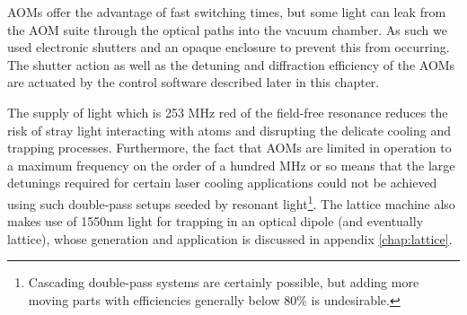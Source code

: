 	AOMs offer the advantage of fast switching times, but some light can leak from the AOM suite through the optical paths into the vacuum chamber.
	As such we used electronic shutters and an opaque enclosure to prevent this from occurring.
	The shutter action as well as the detuning and diffraction efficiency of the AOMs are actuated by the control software described later in this chapter.
	
	The supply of light which is 253 MHz red of the field-free resonance reduces the risk of stray light interacting with atoms and disrupting the delicate cooling and trapping processes.
	Furthermore, the fact that AOMs are limited in operation to a maximum frequency on the order of a hundred MHz or so means that the large detunings required for certain laser cooling applications could not be achieved using such double-pass setups seeded by resonant light\footnote{Cascading double-pass systems are certainly possible, but adding more moving parts with efficiencies generally below 80\% is undesirable.}.
	The lattice machine also makes use of 1550nm light for trapping in an optical dipole (and eventually lattice), whose generation and application is discussed in appendix \ref{chap:lattice}.	


	
	

